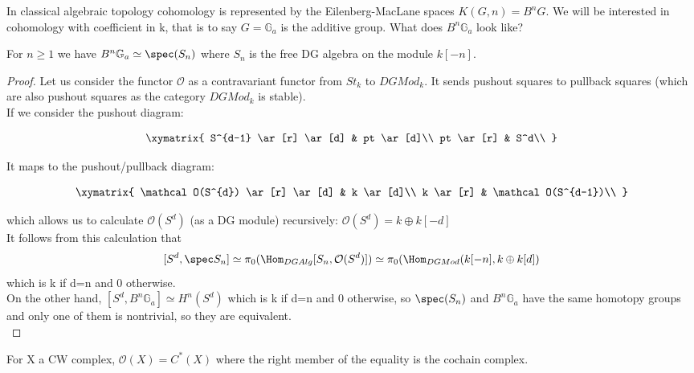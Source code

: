 In classical algebraic topology cohomology is represented by the Eilenberg-MacLane spaces $K(G,n)=B^nG$. We will be interested in cohomology with coefficient
in k, that is to say $G=\mathbb G_a$ is the additive group. What does $B^n\mathbb G_a$ look like? 

\begin{prop}
For $n\ge 1$ we have $B^n\mathbb G_a\simeq \spec(S_n)$ where $S_n$ is the free
DG algebra on the module $k[-n]$.
\end{prop}
\begin{proof}
Let us consider the functor $\mathcal O$ as a contravariant functor from $St_k$ to $DGMod_k$. It sends pushout squares to pullback squares (which are also pushout squares
as the category $DGMod_k$ is stable).\\
If we consider the pushout diagram:


\begin{displaymath}
\xymatrix{
S^{d-1} \ar[r] \ar[d] &  pt \ar[d]\\
 pt \ar[r] & S^d\\
}
\end{displaymath}

It maps to the pushout/pullback diagram:

\begin{displaymath}
\xymatrix{
\mathcal O(S^{d}) \ar[r] \ar[d] &  k \ar[d]\\
 k \ar[r] & \mathcal O(S^{d-1})\\
}
\end{displaymath}

which allows us to calculate $\mathcal O(S^d)$ (as a DG module) recursively: $\mathcal O(S^d)=k\oplus k[-d]$ \\
It follows from this calculation that
\[
[S^d,\spec S_n]\simeq \pi_0(\Hom_{DGAlg}[S_n,\mathcal O(S^d)])\simeq \pi_0(\Hom_{DGMod}(k[-n],k\oplus k[d])
\]
which is k if d=n and 0 otherwise.\\
On the other hand, $[S^d,B^n\mathbb G_a]\simeq H^n(S^d)$ which is k if d=n and 0 otherwise, so $\spec(S_n)$ and $B^n\mathbb G_a$ have the same homotopy groups 
and only one of them is nontrivial, so they are equivalent.\\

\end{proof}


\begin{thm}
For X a CW complex, $\mathcal O(X)=C^*(X)$ where the right member of the equality is the cochain complex.
\end{thm}

